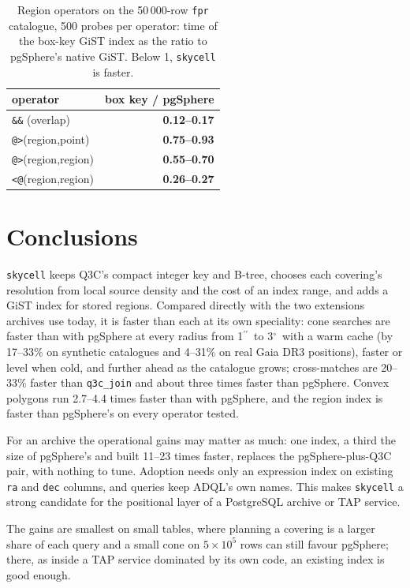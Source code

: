 \documentclass[preprint,12pt]{elsarticle}
\newcommand{\arcsec}{\ensuremath{^{\prime\prime}}}
\newcommand{\degr}{\ensuremath{^{\circ}}}
\begin{document}
\begin{table}
  \caption{Region operators on the 50\,000-row \texttt{fpr} catalogue, 500 probes per
    operator: time of the box-key GiST index as the ratio to pgSphere's native GiST.
    Below 1, \texttt{skycell} is faster.}
  \label{tab:gistregion}
  \centering
  \footnotesize
  \begin{tabular}{l r}
    \hline\hline
    operator & box key / pgSphere \\
    \hline
    \texttt{\&\&} (overlap) & \textbf{0.12--0.17} \\
    \texttt{@>}(region,point) & \textbf{0.75--0.93} \\
    \texttt{@>}(region,region) & \textbf{0.55--0.70} \\
    \texttt{<@}(region,region) & \textbf{0.26--0.27} \\
    \hline
  \end{tabular}
\end{table}

\section{Conclusions}
\label{sec:conclusions}

\texttt{skycell} keeps Q3C's compact integer key and B-tree, chooses each covering's
resolution from local source density and the cost of an index range, and adds a GiST
index for stored regions. Compared directly with the two extensions archives use today,
it is faster than each at its own speciality: cone searches are faster than with
pgSphere at every radius from 1\arcsec\ to 3\degr\ with a warm cache (by 17--33\% on
synthetic catalogues and 4--31\% on real Gaia DR3 positions), faster or level when cold,
and further ahead as the catalogue grows; cross-matches are 20--33\% faster than
\texttt{q3c\_join} and about three times faster than pgSphere. Convex polygons run
2.7--4.4 times faster than with pgSphere, and the region index is faster than
pgSphere's on every operator tested.

For an archive the operational gains may matter as much: one index, a third the size of
pgSphere's and built 11--23 times faster, replaces the pgSphere-plus-Q3C pair, with
nothing to tune. Adoption needs only an expression index on existing \texttt{ra} and
\texttt{dec} columns, and queries keep ADQL's own names. This makes \texttt{skycell} a
strong candidate for the positional layer of a PostgreSQL archive or TAP service.

The gains are smallest on small tables, where planning a covering is a larger share of
each query and a small cone on $5\times10^5$ rows can still favour pgSphere; there, as
inside a TAP service dominated by its own code, an existing index is good enough.
\end{document}
